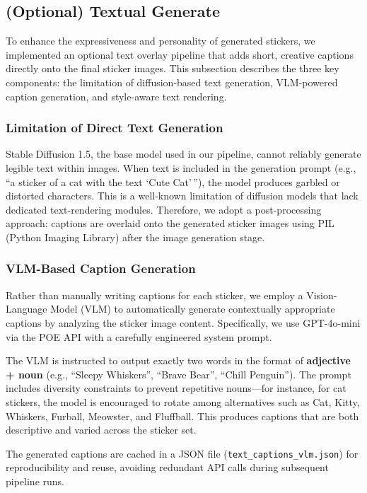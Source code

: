 \subsection{(Optional) Textual Generate}
To enhance the expressiveness and personality of generated stickers, we implemented an optional text overlay pipeline that adds short, creative captions directly onto the final sticker images. This subsection describes the three key components: the limitation of diffusion-based text generation, VLM-powered caption generation, and style-aware text rendering.

\subsubsection{\textbf{Limitation of Direct Text Generation}}
Stable Diffusion 1.5, the base model used in our pipeline, cannot reliably generate legible text within images. When text is included in the generation prompt (e.g., ``a sticker of a cat with the text `Cute Cat'\,''), the model produces garbled or distorted characters. This is a well-known limitation of diffusion models that lack dedicated text-rendering modules. Therefore, we adopt a post-processing approach: captions are overlaid onto the generated sticker images using PIL (Python Imaging Library) after the image generation stage.

\subsubsection{\textbf{VLM-Based Caption Generation}}
Rather than manually writing captions for each sticker, we employ a Vision-Language Model (VLM) to automatically generate contextually appropriate captions by analyzing the sticker image content. Specifically, we use GPT-4o-mini via the POE API with a carefully engineered system prompt.

The VLM is instructed to output exactly two words in the format of \textbf{adjective + noun} (e.g., ``Sleepy Whiskers'', ``Brave Bear'', ``Chill Penguin''). The prompt includes diversity constraints to prevent repetitive nouns---for instance, for cat stickers, the model is encouraged to rotate among alternatives such as Cat, Kitty, Whiskers, Furball, Meowster, and Fluffball. This produces captions that are both descriptive and varied across the sticker set.

The generated captions are cached in a JSON file (\texttt{text\_captions\_vlm.json}) for reproducibility and reuse, avoiding redundant API calls during subsequent pipeline runs.

